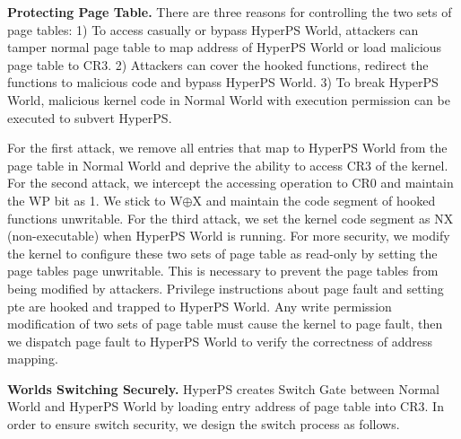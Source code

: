 \documentclass[conference]{IEEEtran}
\begin{document}
\textbf{Protecting Page Table.}
There are three reasons for controlling the two sets of page tables: 1) To access casually or bypass HyperPS World, attackers can tamper normal page table to map address of HyperPS World or load malicious page table to CR3.
2) Attackers can cover the hooked functions, redirect the functions to malicious code and bypass HyperPS World.
 3) To break HyperPS World, malicious kernel code in Normal World with execution permission can be executed to subvert HyperPS.

For the first attack, %
we remove all entries that map to HyperPS World from the page table in Normal World and deprive the ability to access CR3 of the kernel. %
For the second attack, we intercept the accessing operation to CR0 and maintain the WP bit as 1. We stick to W$\oplus${X} and maintain the code segment of hooked functions unwritable.
For the third attack, we set the kernel code segment as NX (non-executable) when HyperPS World is running. For more security, we modify the kernel to configure these two sets of page table as read-only by setting the page tables page unwritable. This is necessary to prevent the page tables from being modified by attackers. Privilege instructions about page fault and setting pte are hooked and trapped to HyperPS World. Any write permission modification of two sets of page table must cause the kernel to page fault, then we dispatch page fault to HyperPS World to verify the correctness of address mapping. 


\textbf{Worlds Switching Securely.}
HyperPS creates Switch Gate between Normal World and HyperPS World by loading entry address of page table into CR3.
In order to ensure switch security, we design the switch process as follows.
\end{document}
